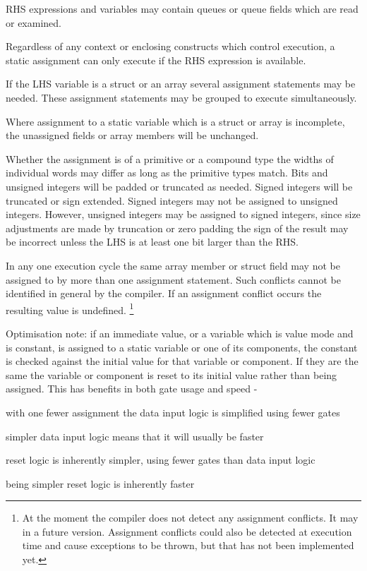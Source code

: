             RHS expressions and variables may contain queues or queue fields
            which are read or examined.

            Regardless of any context or enclosing constructs which control
            execution, a static assignment can only execute if the RHS
            expression is available.

            If the LHS variable is a struct or an array several assignment
            statements may be needed. These assignment statements may be
            grouped to execute simultaneously.

            Where assignment to a static variable which is a struct or array
            is incomplete, the unassigned fields or array members will be
            unchanged.

            Whether the assignment is of a primitive or a compound type the widths
            of individual words may differ as long as the primitive types match.
            Bits and unsigned integers will be padded or truncated as needed. Signed
            integers will be truncated or sign extended. Signed integers may not be
            assigned to unsigned integers. However, unsigned integers may be
            assigned to signed integers, since size adjustments are made by
            truncation or zero padding the sign of the result may be incorrect
            unless the LHS is at least one bit larger than the RHS.

            In any one execution cycle the same array member or struct field
            may not be assigned to by more than one assignment statement. Such
            conflicts cannot be identified in general by the compiler. If an
            assignment conflict occurs the resulting value is undefined.
            \footnote{At the moment the compiler does not detect any
            assignment conflicts. It may in a future version. Assignment
            conflicts could also be detected at execution time and cause
            exceptions to be thrown, but that has not been implemented yet.}
            
            Optimisation note: if an immediate value, or a variable
            which is value mode and is constant, is assigned to a static
            variable or one of its components, the constant is checked
            against the initial value for that variable or component. If
            they are the same the variable or component is reset to its
            initial value rather than being assigned. This has
            benefits in both gate usage and speed -
            \blist
            \item   with one fewer assignment the data input logic is simplified
                    using fewer gates
            \item   simpler data input logic means that it will usually be faster
            \item   reset logic is inherently simpler, using fewer gates than
                    data input logic
            \item   being simpler reset logic is inherently faster
            \blend
            
